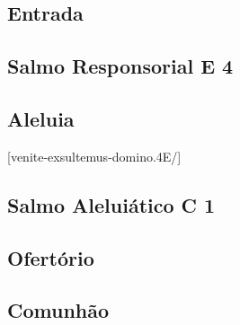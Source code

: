 
\subsection{Entrada}\label{subsection:tempus-per-annum/missa-5/introitus}

\AllowPageFlush

\subsection[Salmo Responsorial]{Salmo Responsorial \textmd{E 4}}\label{subsection:tempus-per-annum/missa-5/psalmus-responsorius}

\AllowPageFlush

\subsection{Aleluia}\label{subsection:tempus-per-annum/missa-5/alleluia}
[venite-exsultemus-domino.4E/]

\subsection[Salmo Aleluiático]{Salmo Aleluiático \textmd{C 1}}\label{subsection:tempus-per-annum/missa-5/psalmus-alleluiaticus}

\AllowPageFlush

\subsection{Ofertório}\label{subsection:tempus-per-annum/missa-5/offertorium}

\AllowPageFlush

\subsection{Comunhão}\label{subsection:tempus-per-annum/missa-5/communio}
